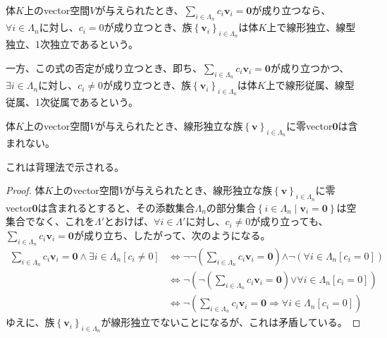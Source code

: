 \documentclass[dvipdfmx]{jsarticle}
\begin{document}
\begin{dfn}
体$K$上のvector空間$V$が与えられたとき、$\sum_{i \in \varLambda_{n}} {c_{i}\mathbf{v}_{i}} = \mathbf{0}$が成り立つなら、$\mathbf{\forall}i \in \varLambda_{n}$に対し、$c_{i} = 0$が成り立つとき、族$\left\{ \mathbf{v}_i \right\}_{i\in \varLambda_n } $は体$K$上で線形独立、線型独立、1次独立であるという。\par
一方、この式の否定が成り立つとき、即ち、$\sum_{i \in \varLambda_{n}} {c_{i}\mathbf{v}_{i}} = \mathbf{0}$が成り立つかつ、$\exists i \in \varLambda_{n}$に対し、$c_{i} \neq 0$が成り立つとき、族$\left\{ \mathbf{v}_i \right\}_{i\in \varLambda_n } $は体$K$上で線形従属、線型従属、1次従属であるという。
\end{dfn}
\begin{thm}\label{2.1.1.12}
体$K$上のvector空間$V$が与えられたとき、線形独立な族$\left\{ \mathbf{v} \right\}_{i\in \varLambda_n } $に零vector$\mathbf{0}$は含まれない。
\end{thm}\par
これは背理法で示される。
\begin{proof}
体$K$上のvector空間$V$が与えられたとき、線形独立な族$\left\{ \mathbf{v} \right\}_{i\in \varLambda_n } $に零vector$\mathbf{0}$は含まれるとすると、その添数集合$\varLambda_{n}$の部分集合$\left\{ i \in \varLambda_{n} \middle| \mathbf{v}_{i} = \mathbf{0} \right\}$は空集合でなく、これを$\varLambda'$とおけば、$\mathbf{\forall}i \in \varLambda'$に対し、$c_{i} \neq 0$が成り立っても、$\sum_{i \in \varLambda_{n}} {c_{i}\mathbf{v}_{i}} = \mathbf{0}$が成り立ち、したがって、次のようになる。
\begin{align*}
\sum_{i \in \varLambda_{n}} {c_{i}\mathbf{v}_{i}} = \mathbf{0 \land \exists}i \in \varLambda_{n}\left\lbrack c_{i} \neq 0 \right\rbrack &\Leftrightarrow \neg\neg\left( \sum_{i \in \varLambda_{n}} {c_{i}\mathbf{v}_{i}} = \mathbf{0} \right)\mathbf{\land \neg}\left( \mathbf{\forall}i \in \varLambda_{n}\left\lbrack c_{i} = 0 \right\rbrack \right)\\
&\mathbf{\Leftrightarrow \neg}\left( \neg\left( \sum_{i \in \varLambda_{n}} {c_{i}\mathbf{v}_{i}} = \mathbf{0} \right)\mathbf{\vee \forall}i \in \varLambda_{n}\left\lbrack c_{i} = 0 \right\rbrack \right)\\
&\mathbf{\Leftrightarrow \neg}\left( \sum_{i \in \varLambda_{n}} {c_{i}\mathbf{v}_{i}} = \mathbf{0 \Rightarrow \forall}i \in \varLambda_{n}\left\lbrack c_{i} = 0 \right\rbrack \right)
\end{align*}
ゆえに、族$\left\{ \mathbf{v}_i \right\}_{i\in \varLambda_n } $が線形独立でないことになるが、これは矛盾している。
\end{proof}
\end{document}
